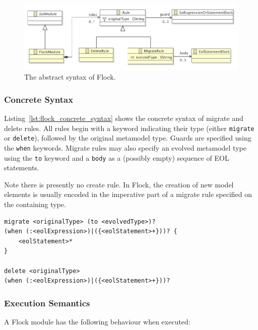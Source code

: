\begin{figure}
  \centering
  \includegraphics[scale=0.75]{5.Implementation/flock_abstract_syntax.pdf}
  \caption{The abstract syntax of Flock.}
  \label{fig:abstract_syntax}
\end{figure}

\subsubsection{Concrete Syntax}
\label{subsubsec:concrete_syntax}

Listing~\ref{lst:flock_concrete_syntax} shows the concrete syntax of migrate and delete rules. All rules begin with a keyword indicating their type (either \texttt{migrate} or \texttt{delete}), followed by the original metamodel type. Guards are specified using the \texttt{when} keywords. Migrate rules may also specify an evolved metamodel type using the \texttt{to} keyword and a \texttt{body} as a (possibly empty) sequence of EOL statements.

Note there is presently no create rule. In Flock, the creation of new model elements is usually encoded in the imperative part of a migrate rule specified on the containing type.

\begin{lstlisting}[float=tbp, caption=Concrete syntax of migrate and delete rules., label=lst:flock_concrete_syntax, language=Flock]
migrate <originalType> (to <evolvedType>)?
(when (:<eolExpression>)|({<eolStatement>+}))? {
	<eolStatement>*
} 

delete <originalType>
(when (:<eolExpression>)|({<eolStatement>+}))?
\end{lstlisting}

\subsubsection{Execution Semantics}
\label{subsubsec:execution_semantics}
A Flock module has the following behaviour when executed:

